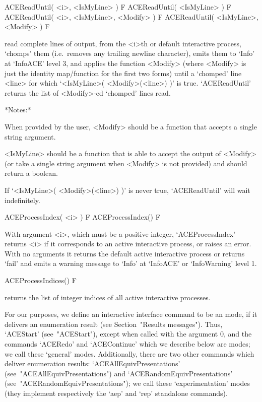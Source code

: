 \>ACEReadUntil( <i>, <IsMyLine> ) F
\>ACEReadUntil( <IsMyLine> ) F
\>ACEReadUntil( <i>, <IsMyLine>, <Modify> ) F
\>ACEReadUntil( <IsMyLine>, <Modify> ) F

read complete lines of  {\ACE}  output,  from  the  <i>th  or  default
interactive  {\ACE}  process,  \lq{}chomps'  them  (i.e.~removes   any
trailing newline character), emits them to `Info' at  `InfoACE'  level
3, and applies the function  <Modify>  (where  <Modify>  is  just  the
identity map/function for the first two forms) until  a  \lq{}chomped'
line <line>  for  which  `<IsMyLine>(  <Modify>(<line>)  )'  is  true.
`ACEReadUntil' returns the list  of  <Modify>-ed  \lq{}chomped'  lines
read.

*Notes:* 

When provided by the user, <Modify> should be a function that  accepts
a single string argument.

<IsMyLine> should be a function that is able to accept the  output  of
<Modify> (or take a  single  string  argument  when  <Modify>  is  not
provided) and should return a boolean.

If `<IsMyLine>( <Modify>(<line>) )' is never true, `ACEReadUntil' will
wait indefinitely.

\enditems


\beginitems

\>ACEProcessIndex( <i> ) F
\>ACEProcessIndex() F

With argument <i>, which must be a positive integer, `ACEProcessIndex'
returns <i> if it corresponds to an  active  interactive  process,  or
raises an error. With no  arguments  it  returns  the  default  active
interactive process or returns `fail' and emits a warning  message  to
`Info' at `InfoACE' or `InfoWarning' level 1.

\>ACEProcessIndices() F

returns the list of integer indices of all active  interactive  {\ACE}
processes.

\enditems


For our purposes, we define an interactive {\ACE} interface command to
be  an  {\ACE}  mode,  if  it  delivers  an  enumeration  result  (see
Section~"Results messages"). Thus, `ACEStart' (see~"ACEStart"), except
when called with the  argument  0,  and  the  commands  `ACERedo'  and
`ACEContinue' which we describe below are {\ACE} modes; we call  these
\lq{}general' {\ACE} modes. Additionally, there are two other commands
which   deliver   enumeration   results:    `ACEAllEquivPresentations'
(see~"ACEAllEquivPresentations")   and   `ACERandomEquivPresentations'
(see~"ACERandomEquivPresentations");       we        call        these
\lq{}experimentation' {\ACE} modes (they  implement  respectively  the
`aep' and `rep' {\ACE} standalone commands).

